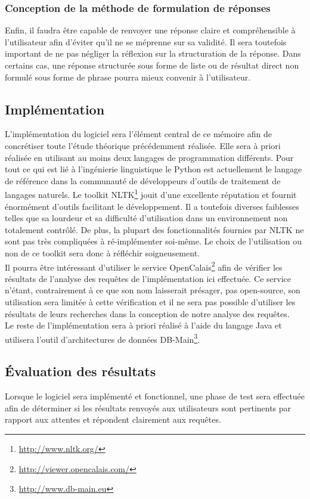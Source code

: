\documentclass[a4paper,12pt]{article}
\begin{document}
\subsubsection{Conception de la méthode de formulation de réponses}
Enfin, il faudra être capable de renvoyer une réponse claire et compréhensible à l'utilisateur afin d'éviter qu'il ne se méprenne sur sa validité.
Il sera toutefois important de ne pas négliger la réflexion sur la structuration de la réponse.
Dans certains cas, une réponse structurée sous forme de liste ou de résultat direct non formulé sous forme de phrase pourra mieux convenir à l'utilisateur.
\subsection{Implémentation}
L'implémentation du logiciel sera l'élément central de ce mémoire afin de concrétiser toute l'étude théorique précédemment réalisée.
Elle sera à priori réalisée en utilisant au moins deux langages de programmation différents.
Pour tout ce qui est lié à l'ingénierie linguistique le Python est actuellement le langage de référence dans la communauté de développeurs d'outils de traitement de langages naturels.
Le toolkit NLTK\footnote{\url{http://www.nltk.org/}} jouit d'une excellente réputation et fournit énormément d'outils facilitant le développement.
Il a toutefois diverses faiblesses telles que sa lourdeur et sa difficulté d'utilisation dans un environnement non totalement contrôlé.
De plus, la plupart des fonctionnalités fournies par NLTK ne sont pas très compliquées à ré-implémenter soi-même.
Le choix de l'utilisation ou non de ce toolkit sera donc à réfléchir soigneusement. \\

Il pourra être intéressant d'utiliser le service OpenCalais\footnote{\url{http://viewer.opencalais.com/}} afin de vérifier les résultats de l'analyse des requêtes de l'implémentation ici effectuée.
Ce service n'étant, contrairement à ce que son nom laisserait présager, pas open-source, son utilisation sera limitée à cette vérification et il ne sera pas possible d'utiliser les résultats de leurs recherches dans la conception de notre analyse des requêtes. \\

Le reste de l'implémentation sera à priori réalisé à l'aide du langage Java et utilisera l'outil d'architectures de données DB-Main\footnote{\url{http://www.db-main.eu}}.
\subsection{Évaluation des résultats}
Lorsque le logiciel sera implémenté et fonctionnel, une phase de test sera effectuée afin de déterminer si les résultats renvoyés aux utilisateurs sont pertinents par rapport aux attentes et répondent clairement aux requêtes.
\end{document}
